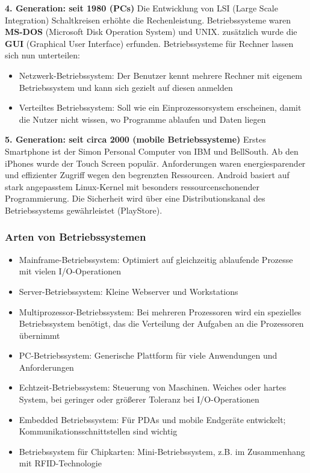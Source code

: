 \documentclass{article}
\begin{document}
    \textbf{4. Generation: seit 1980 (PCs)}\newline
    Die Entwicklung von LSI (Large Scale Integration) Schaltkreisen erhöhte die Rechenleistung. Betriebssysteme waren \textbf{MS-DOS} (Microsoft Disk Operation System) und UNIX. zusätzlich wurde die \textbf{GUI} (Graphical User Interface) erfunden.\newline
    Betriebssysteme für Rechner lassen sich nun unterteilen:
    \begin{itemize}
        \item Netzwerk-Betriebssystem: Der Benutzer kennt mehrere Rechner mit eigenem Betriebssystem und kann sich gezielt auf diesen anmelden
        \item Verteiltes Betriebssystem: Soll wie ein Einprozessorsystem erscheinen, damit die Nutzer nicht wissen, wo Programme ablaufen und Daten liegen
    \end{itemize}
    \textbf{5. Generation: seit circa 2000 (mobile Betriebssysteme)}\newline
    Erstes Smartphone ist der Simon Personal Computer von IBM und BellSouth. Ab den iPhones wurde der Touch Screen populär. Anforderungen waren energiesparender und effizienter Zugriff wegen den begrenzten Ressourcen. Android basiert auf stark angepasstem Linux-Kernel mit besonders ressourcenschonender Programmierung. Die Sicherheit wird über eine Distributionskanal des Betriebssystems gewährleistet (PlayStore).
\subsubsection{Arten von Betriebssystemen}
    \begin{itemize}
        \item Mainframe-Betriebssystem: Optimiert auf gleichzeitig ablaufende Prozesse mit vielen I/O-Operationen
        \item Server-Betriebssystem: Kleine Webserver und Workstations
        \item Multiprozessor-Betriebssystem: Bei mehreren Prozessoren wird ein spezielles Betriebssystem benötigt, das die Verteilung der Aufgaben an die Prozessoren übernimmt
        \item PC-Betriebssystem: Generische Plattform für viele Anwendungen und Anforderungen
        \item Echtzeit-Betriebssystem: Steuerung von Maschinen. Weiches oder hartes System, bei geringer oder größerer Toleranz bei I/O-Operationen
        \item Embedded Betriebssystem: Für PDAs und mobile Endgeräte entwickelt; Kommunikationsschnittstellen sind wichtig
        \item Betriebssystem für Chipkarten: Mini-Betriebssystem, z.B. im Zusammenhang mit RFID-Technologie
    \end{itemize}
    
\end{document}
